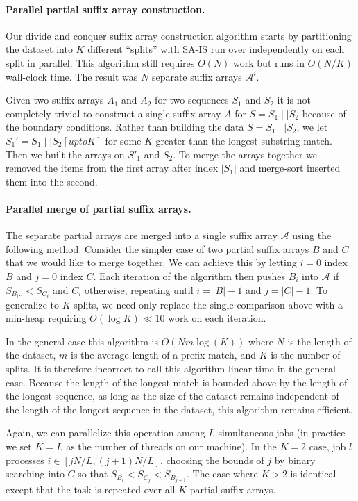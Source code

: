 \paragraph{Parallel partial suffix array construction.}
%
Our divide and conquer suffix array construction algorithm starts by 
partitioning the dataset into $K$ different ``splits'' with SA-IS run
over independently on each split in parallel.
%
This algorithm still requires $O(N)$ work but runs in $O(N/K)$ wall-clock time.
%
The result was $N$ separate suffix arrays $\mathcal{A}^i$.

Given two suffix arrays $A_1$ and $A_2$ for two sequences $S_1$ and $S_2$ it is not completely trivial to construct a single suffix array $A$ for $S = S_1 \mid\mid S_2$ 
because of the boundary conditions.
Rather than building the data $S = S_1 \mid\mid S_2$, we let $S_1' = S_1 \mid\mid S_2[upto K]$ for some $K$ greater than the longest substring match.
Then we built the arrays on $S'_1$ and $S_2$.
To merge the arrays together we removed the items from the first array after index $|S_1|$ and merge-sort inserted them into the second.

\paragraph{Parallel merge of partial suffix arrays.}
The separate partial arrays are merged into a single suffix array $\mathcal{A}$ using the following method.
%
Consider the simpler case of two partial suffix arrays $B$ and $C$ that we 
would like to merge together.
%
We can achieve this by letting $i=0$ index $B$ and $j=0$ index $C$.
%
Each iteration of the algorithm then pushes $B_i$ into $\mathcal{A}$ if
$S_{B_i..} < S_{C_i}$ and $C_i$ otherwise, repeating until $i=|B|-1$ and $j=|C|-1$.
%
To generalize to $K$ splits, we need only replace the single comparison above with
a min-heap requiring $O(\log{K}) \ll 10$ work on each iteration.

In the general case this algorithm is $O(N m \log(K))$ where $N$ is the length
of the dataset, $m$ is the average length of a prefix match, and $K$ is the number of splits.
%
It is therefore incorrect to call this algorithm linear time in the general case.
%
Because the length of the longest match is bounded above by the length of the longest
sequence, as long as the size of the dataset remains independent of the length of the 
longest sequence in the dataset, this algorithm remains efficient.

Again, we can parallelize this operation among $L$ simultaneous jobs 
(in practice we set $K=L$ as the number of threads on our machine).
%
In the $K=2$ case, job $l$ processes $i \in [jN/L, (j+1)N/L]$, choosing
the bounds of $j$ by binary searching into $C$ so that $S_{B_{i}} < S_{C_{j}} < S_{B_{j+1}}$.
%
The case where $K>2$ is identical except that the task is repeated over all $K$ partial suffix arrays.


